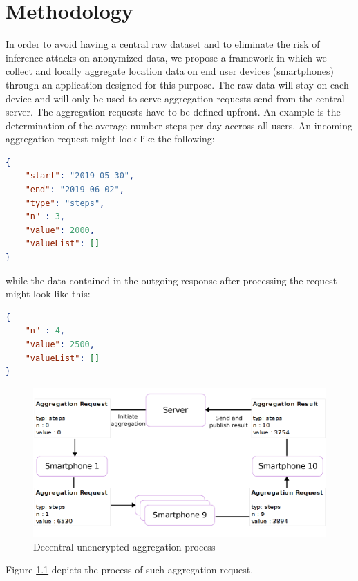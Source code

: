 \chapter{Methodology}\label{chapter:method}
In order to avoid having a central raw dataset and to eliminate the risk of inference attacks on anonymized data, we propose a framework in which we collect and locally aggregate location data on end user devices (smartphones) through an application designed for this purpose. The raw data will stay on each device and will only be used to serve aggregation requests send from the central server. The aggregation requests have to be defined upfront. An example is the determination of the average number steps per day accross all users. An incoming aggregation request might look like the following:
\begin{lstlisting}[language=json,firstnumber=1]
{
	"start": "2019-05-30",
	"end": "2019-06-02",
	"type": "steps",
	"n" : 3,
	"value": 2000,
	"valueList": []
}
\end{lstlisting}
while the data contained in the outgoing response after processing the request might look like this:
\begin{lstlisting}[language=json,firstnumber=1]
{
	"n" : 4,
	"value": 2500,
	"valueList": []
}
\end{lstlisting}
\begin{figure}[h!]
	\caption{Decentral unencrypted aggregation process}
	\label{decentral-aggregation-unencrypted}
	\includegraphics[width=\textwidth]{data/diagrams/decentral-aggregation-6.png}
\end{figure}
Figure \ref{decentral-aggregation-unencrypted} depicts the process of such aggregation request.
